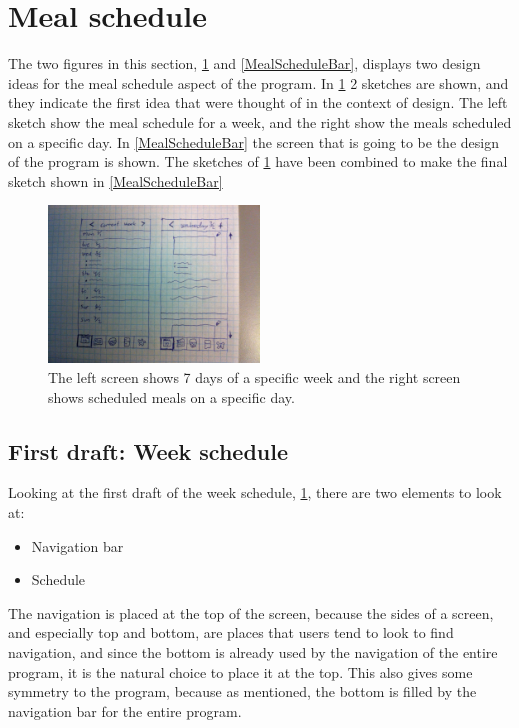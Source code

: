\section{Meal schedule}

The two figures in this section, \cref{MealScheduleList} and \cref{MealScheduleBar}, displays two design ideas for the meal schedule aspect of the program. In \cref{MealScheduleList} 2 sketches are shown, and they indicate the first idea that were thought of in the context of design. The left sketch show the meal schedule for a week, and the right show the meals scheduled on a specific day. In \cref{MealScheduleBar} the screen that is going to be the design of the program is shown. The sketches of \cref{MealScheduleList} have been combined to make the final sketch shown in \cref{MealScheduleBar}

\begin{figure}[H]
	\centering
    \includegraphics[width=0.5\textwidth]{Grafik/FoodPlanner/FinalMealScheduleSketch1}
	\caption{The left screen shows 7 days of a specific week and the right screen shows scheduled meals on a specific day.}
	\label{MealScheduleList}
\end{figure}

\subsection{First draft: Week schedule} \label{FirstDraftWeekSchedule}

Looking at the first draft of the week schedule, \cref{MealScheduleList}, there are two elements to look at:

\begin{itemize}
    \item Navigation bar
    \item Schedule
\end{itemize}

The navigation is placed at the top of the screen, because the sides of a screen, and especially top and bottom, are places that users tend to look to find navigation, and since the bottom is already used by the navigation of the entire program, it is the natural choice to place it at the top. This also gives some symmetry to the program, because as mentioned, the bottom is filled by the navigation bar for the entire program.

